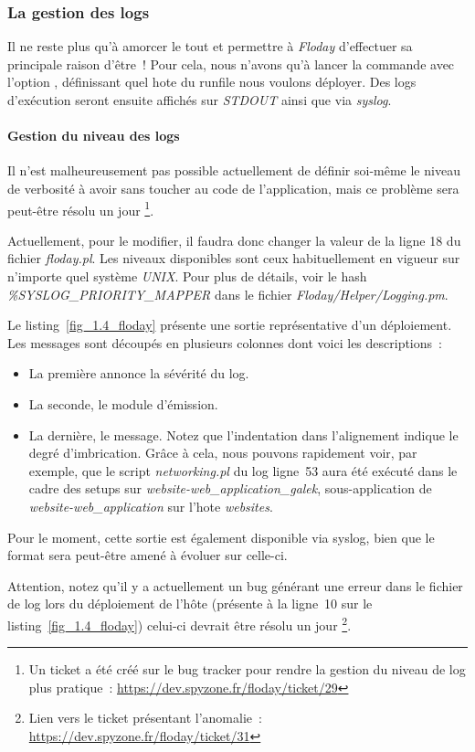 \subsubsection{La gestion des logs}

Il ne reste plus qu'à amorcer le tout et permettre à \emph{Floday} d'effectuer sa principale raison d'être~!
Pour cela, nous n'avons qu'à lancer la commande  avec l'option , définissant quel \gls{hote} du runfile nous voulons déployer.
Des logs d'exécution seront ensuite affichés sur \emph{STDOUT} ainsi que via \emph{syslog}.

\paragraph{Gestion du niveau des logs}
Il n'est malheureusement pas possible actuellement de définir soi-même le niveau de verbosité à avoir sans toucher au code de l'application, mais ce problème sera peut-être résolu un jour%
\footnote{Un ticket a été créé sur le bug tracker pour rendre la gestion du niveau de log plus pratique~: \url{https://dev.spyzone.fr/floday/ticket/29}}.

Actuellement, pour le modifier, il faudra donc changer la valeur de la ligne 18 du fichier \emph{floday.pl}.
Les niveaux disponibles sont ceux habituellement en vigueur sur n'importe quel système \emph{UNIX}.
Pour plus de détails, voir le hash \emph{\%SYSLOG\_PRIORITY\_MAPPER} dans le fichier \emph{Floday/Helper/Logging.pm}.



Le listing~\ref{fig_1.4_floday} présente une sortie représentative d'un déploiement.
Les messages sont découpés en plusieurs colonnes dont voici les descriptions~:
\begin{itemize}
	\item La première annonce la sévérité du log.
	\item La seconde, le module d'émission.
	\item La dernière, le message. Notez que l'indentation dans l'alignement indique le degré d'imbrication. Grâce à cela, nous pouvons rapidement voir, par exemple, que le script \emph{networking.pl} du log ligne~53 aura été exécuté dans le cadre des setups sur \emph{website-web\_application\_galek}, sous-application de \emph{website-web\_application} sur l'\gls{hote} \emph{websites}.
\end{itemize}

Pour le moment, cette sortie est également disponible via syslog, bien que le format sera peut-être amené à évoluer sur celle-ci.

Attention, notez qu'il y a actuellement un bug générant une erreur dans le fichier de log lors du déploiement de l'hôte (présente à la ligne~10 sur le listing~\ref{fig_1.4_floday}) celui-ci devrait être résolu un jour%
\footnote{Lien vers le ticket présentant l'anomalie~: \url{https://dev.spyzone.fr/floday/ticket/31}}.
